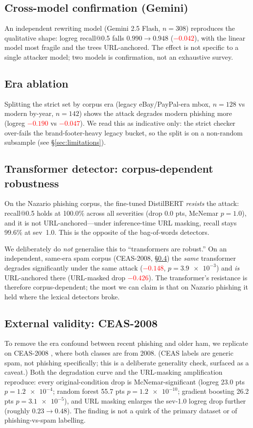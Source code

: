 \documentclass[11pt]{article}
\newcommand{\dropneg}[1]{\textcolor{red}{$-#1$}}
\begin{document}
\subsection{Cross-model confirmation (Gemini)}
An independent rewriting model (Gemini 2.5 Flash, $n=308$) reproduces the
qualitative shape: logreg recall@0.5 falls $0.990\!\to\!0.948$
(\dropneg{0.042}), with the linear model most fragile and the trees URL-anchored.
The effect is not specific to a single attacker model; two models is confirmation,
not an exhaustive survey.

\subsection{Era ablation}
Splitting the strict set by corpus era (legacy eBay/PayPal-era mbox, $n=128$ vs
modern by-year, $n=142$) shows the attack degrades modern phishing more (logreg
\dropneg{0.190} vs \dropneg{0.047}). We read this as indicative only: the strict
checker over-fails the brand-footer-heavy legacy bucket, so the split is on a
non-random subsample (see \S\ref{sec:limitations}).

\subsection{Transformer detector: corpus-dependent robustness}
On the Nazario phishing corpus, the fine-tuned DistilBERT \emph{resists} the
attack: recall@0.5 holds at 100.0\% across all severities (drop 0.0 pts, McNemar
$p=1.0$), and it is not URL-anchored---under inference-time URL masking, recall
stays 99.6\% at sev~1.0. This is the opposite of the bag-of-words detectors.

We deliberately do \emph{not} generalise this to ``transformers are robust.'' On an
independent, same-era spam corpus (CEAS-2008, \S\ref{sec:external}) the
\emph{same} transformer degrades significantly under the same attack
(\dropneg{0.148}, $p=\num{3.9e-3}$) and \emph{is} URL-anchored there (URL-masked
drop \dropneg{0.426}). The transformer's resistance is therefore corpus-dependent;
the most we can claim is that on Nazario phishing it held where the lexical
detectors broke.

\subsection{External validity: CEAS-2008}\label{sec:external}
To remove the era confound between recent phishing and older ham, we replicate on
CEAS-2008 \citep{champa2023phishing}, where both classes are from 2008.
(CEAS labels are generic spam, not phishing specifically; this is a deliberate
generality check, surfaced as a caveat.) Both the degradation curve and the
URL-masking amplification reproduce: every original-condition drop is
McNemar-significant (logreg 23.0 pts $p=\num{1.2e-4}$; random forest 55.7 pts
$p=\num{1.2e-10}$; gradient boosting 26.2 pts $p=\num{3.1e-5}$), and URL masking
enlarges the sev-1.0 logreg drop further (roughly $0.23\!\to\!0.48$). The finding
is not a quirk of the primary dataset or of phishing-vs-spam labelling.
\end{document}

